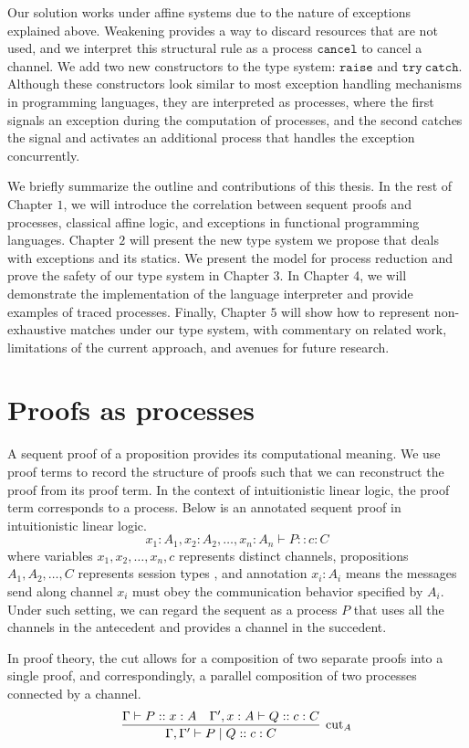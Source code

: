 \documentclass[12pt, openany]{memoir}
\begin{document}
Our solution works under affine systems due to the nature of exceptions explained above. 
Weakening provides a way to discard resources that are not used, and we interpret this structural rule as a process $\texttt{cancel}$ to cancel a channel. 
We add two new constructors to the type system: $\texttt{raise}$ and $\texttt{try}\ \texttt{catch}$. 
Although these constructors look similar to most exception handling mechanisms in programming languages, 
they are interpreted as processes, where the first signals an exception during the computation of processes,
and the second catches the signal and activates an additional process that handles the exception concurrently.

We briefly summarize the outline and contributions of this thesis.
In the rest of Chapter $1$, we will introduce the correlation between sequent proofs and processes, classical affine logic, and exceptions in functional programming languages.
Chapter $2$ will present the new type system we propose that deals with exceptions and its statics.
We present the model for process reduction and prove the safety of our type system in Chapter $3$.
In Chapter 4, we will demonstrate the implementation of the language interpreter and provide examples of traced processes.
Finally, Chapter $5$ will show how to represent non-exhaustive matches under our type system, with commentary on related work, limitations of the current approach, and avenues for future research.
\section{Proofs as processes} 
A sequent proof of a proposition provides its computational meaning.
We use proof terms to record the structure of proofs such that we can reconstruct the proof from its proof term.
In the context of intuitionistic linear logic, the proof term corresponds to a process. 
Below is an annotated sequent proof in intuitionistic linear logic.
\[
  x_1 : A_1, x_2 : A_2, \ldots, x_n : A_n \vdash P :: c : C
\]
where variables $x_1, x_2, \ldots, x_n, c$ represents distinct channels, propositions $A_1, A_2, \ldots, C$ represents session types \cite{Caires2010}, 
and annotation $x_i : A_i$ means the messages send along channel $x_i$ must obey the communication behavior specified by $A_i$.
Under such setting, we can regard the sequent as a process $P$ that uses all the channels in the antecedent and provides a channel in the succedent.

In proof theory, the cut allows for a composition of two separate proofs into a single proof, and correspondingly, a parallel composition of two processes connected by a channel.
\[
  \infer[\text{cut}_A]{\Gamma, \Gamma' \vdash P \mid Q :: c : C}{
    \Gamma \vdash P :: x : A
    &
    \Gamma', x : A \vdash Q :: c : C
  }
\]
\end{document}
